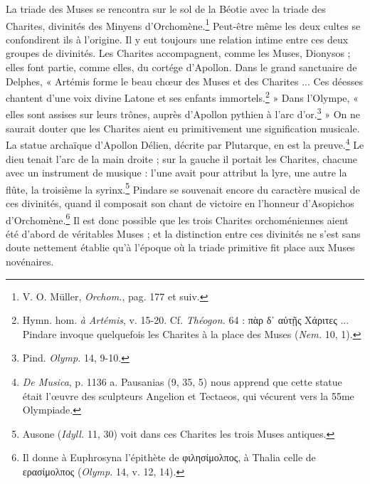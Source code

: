 \documentclass[landscape, a4paper, 11pt, oneside, polutonikogreek, french]{article}
\begin{document}
La triade des Muses se rencontra sur le sol de la Béotie avec la triade des Charites, divinités des Minyens d'Orchomène.\footnote{V. O. Müller, \emph{Orchom.}, pag. 177 et suiv.} Peut-être même les deux cultes se confondirent ils à l'origine. Il y eut toujours une relation intime entre ces deux groupes de divinités. Les Charites accompagnent, comme les Muses, Dionysos ; elles font partie, comme elles, du cortége d'Apollon. Dans le grand sanctuaire de Delphes, « Artémis forme le beau chœur des Muses et des Charites ... Ces déesses chantent d'une voix divine Latone et ses enfants immortels.\footnote{Hymn. hom. \emph{à Artémis}, v. 15-20. Cf. \emph{Théogon.} 64 : πὰρ δ᾽ αὐτῇς Χάριτες ... Pindare invoque quelquefois les Charites à la place des Muses (\emph{Nem.} 10, 1).} » Dans l'Olympe, « elles sont assises sur leurs trônes, auprès d'Apollon pythien à l'arc d'or.\footnote{Pind. \emph{Olymp.} 14, 9-10.} » On ne saurait douter que les Charites aient eu primitivement une signification musicale. La statue archaïque d'Apollon Délien, décrite par Plutarque, en est la preuve.\footnote{\emph{De Musica}, p. 1136 a. Pausanias (9, 35, 5) nous apprend que cette statue était l'œuvre des sculpteurs Angelion et Tectaeos, qui vécurent vers la 55me Olympiade.} Le dieu tenait l'arc de la main droite ; sur la gauche il portait les Charites, chacune avec un instrument de musique : l'une avait pour attribut la lyre, une autre la flûte, la troisième la syrinx.\footnote{Ausone (\emph{Idyll.} 11, 30) voit dans ces Charites les trois Muses antiques.} Pindare se souvenait encore du caractère musical de ces divinités, quand il composait son chant de victoire en l'honneur d'Asopichos d'Orchomène.\footnote{Il donne à Euphrosyna l'épithète de φιλησίμολπος, à Thalia celle de ερασίμολπος (\emph{Olymp.} 14, v. 12, 14).} Il est donc possible que les trois Charites orchoméniennes aient été d'abord de véritables Muses ; et la distinction entre ces divinités ne s'est sans doute nettement établie qu'à l'époque où la triade primitive fit place aux Muses novénaires.
\end{document}
